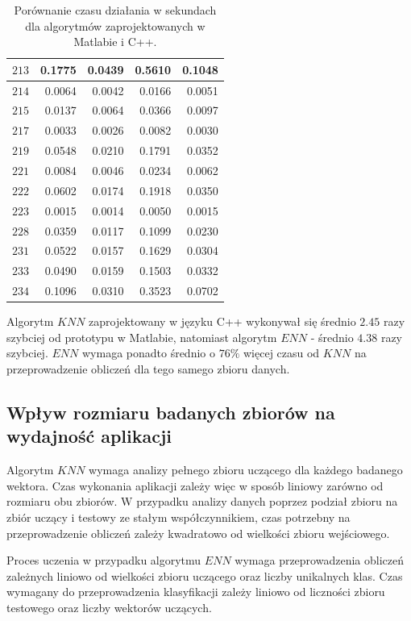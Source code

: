 \begin{table}[H]
\begin{tabular}{|c|r|r|r|r|}
\hline
$213$ & 0.1775 & 0.0439 & 0.5610 & 0.1048 \\
\hline
$214$ & 0.0064 & 0.0042 & 0.0166 & 0.0051 \\
\hline
$215$ & 0.0137 & 0.0064 & 0.0366 & 0.0097 \\
\hline
$217$ & 0.0033 & 0.0026 & 0.0082 & 0.0030 \\
\hline
$219$ & 0.0548 & 0.0210 & 0.1791 & 0.0352 \\
\hline
$221$ & 0.0084 & 0.0046 & 0.0234 & 0.0062 \\
\hline
$222$ & 0.0602 & 0.0174 & 0.1918 & 0.0350 \\
\hline
$223$ & 0.0015 & 0.0014 & 0.0050 & 0.0015 \\
\hline
$228$ & 0.0359 & 0.0117 & 0.1099 & 0.0230 \\
\hline
$231$ & 0.0522 & 0.0157 & 0.1629 & 0.0304 \\
\hline
$233$ & 0.0490 & 0.0159 & 0.1503 & 0.0332 \\
\hline
$234$ & 0.1096 & 0.0310 & 0.3523 & 0.0702 \\
\hline	
	\end{tabular}
	\caption{Porównanie czasu działania w sekundach dla algorytmów zaprojektowanych w Matlabie i C++.}
	\label{tab:matlab-vs-cpp-time}	
\end{table}
Algorytm $KNN$ zaprojektowany w języku C++ wykonywał się średnio $2.45$ razy szybciej od prototypu w Matlabie, natomiast algorytm $ENN$ - średnio $4.38$ razy szybciej. $ENN$ wymaga ponadto średnio o $76\%$ więcej czasu od $KNN$ na przeprowadzenie obliczeń dla tego samego zbioru danych.

\subsection{Wpływ rozmiaru badanych zbiorów na wydajność aplikacji}
Algorytm $KNN$ wymaga analizy pełnego zbioru uczącego dla każdego badanego wektora. Czas wykonania aplikacji zależy więc w sposób liniowy zarówno od rozmiaru obu zbiorów. W przypadku analizy danych poprzez podział zbioru na zbiór uczący i testowy ze stałym współczynnikiem, czas potrzebny na przeprowadzenie obliczeń zależy kwadratowo od wielkości zbioru wejściowego.

Proces uczenia w przypadku algorytmu $ENN$ wymaga przeprowadzenia obliczeń zależnych liniowo od wielkości zbioru uczącego oraz liczby unikalnych klas. Czas wymagany do przeprowadzenia klasyfikacji zależy liniowo od liczności zbioru testowego oraz liczby wektorów uczących.

